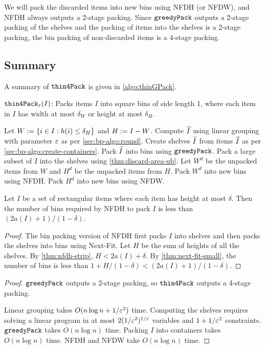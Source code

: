 We will pack the discarded items into new bins using NFDH (or NFDW),
and NFDH always outputs a 2-stage packing.
Since $\operatorname{\mathtt{greedyPack}}$ outputs a 2-stage packing of the shelves
and the packing of items into the shelves is a 2-stage packing,
the bin packing of non-discarded items is a 4-stage packing.

\subsection{Summary}

A summary of $\operatorname{\mathtt{thin4Pack}}$ is given in \cref{algo:thinGPack}.

\begin{algorithm}[!ht]
\caption{$\operatorname{\mathtt{thin4Pack}}_{\varepsilon}(I)$: Packs items $I$ into square bins of side length 1,
where each item in $I$ has width at most $\delta_W$ or height at most $\delta_H$.}
\label{algo:thinGPack}
\begin{algorithmic}[1]
\State Let $W := \{i \in I: h(i) \le \delta_H\}$ and $H := I - W$.
\State Compute $\widehat{I}$ using linear grouping with parameter $\varepsilon$ as per \cref{sec:bp-algo:round}.
\State Create shelves $\widetilde{I}$ from items $\widehat{I}$ as per \cref{sec:bp-algo:create-containers}.
\State Pack $\widetilde{I}$ into bins using $\operatorname{\mathtt{greedyPack}}$.
\State Pack a large subset of $I$ into the shelves using \cref{thm:discard-area-ub}.
Let $W^d$ be the unpacked items from $W$ and $H^d$ be the unpacked items from $H$.
\State Pack $W^d$ into new bins using NFDH.
\State Pack $H^d$ into new bins using NFDW.
\end{algorithmic}
\end{algorithm}

\begin{lemma}
\label{thm:nfdh-small-multi}
Let $I$ be a set of rectangular items where each item has height at most $\delta$.
Then the number of bins required by NFDH to pack $I$ is less than
$(2a(I)+1)/(1-\delta)$.
\end{lemma}
\begin{proof}
The bin packing version of NFDH first packs $I$ into shelves
and then packs the shelves into bins using Next-Fit.
Let $H$ be the sum of heights of all the shelves.
By \cref{thm:nfdh-strip}, $H < 2a(I) + \delta$.
By \cref{thm:next-fit-small}, the number of bins
is less than $1 + H/(1-\delta) < (2a(I)+1)/(1-\delta)$.
\end{proof}

\rthmThinGPackProps*
\begin{proof}
$\operatorname{\mathtt{greedyPack}}$ outputs a 2-stage packing, so $\operatorname{\mathtt{thin4Pack}}$ outputs a 4-stage packing.

Linear grouping takes $O(n\log n + 1/\varepsilon^2)$ time.
Computing the shelves requires solving a linear program in at most
$2(1/\varepsilon^2)^{1/\varepsilon}$ variables and $1+1/\varepsilon^2$ constraints.
$\operatorname{\mathtt{greedyPack}}$ takes $O(n\log n)$ time.
Packing $I$ into containers takes $O(n\log n)$ time.
NFDH and NFDW take $O(n\log n)$ time.
\end{proof}

